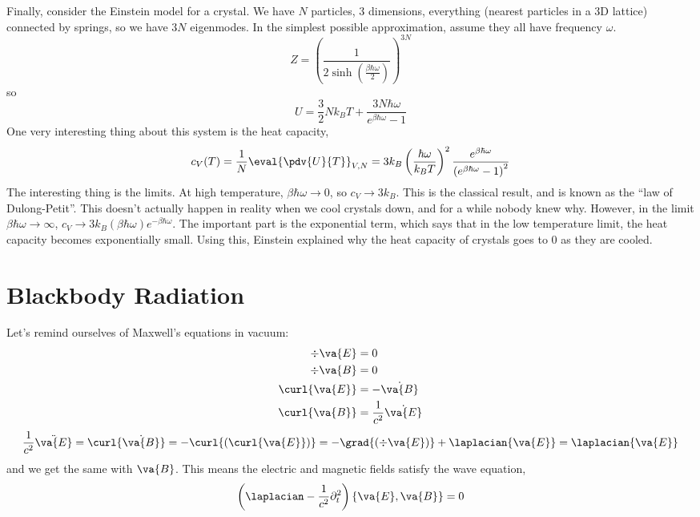 \documentclass[a4paper,twoside,master.tex]{subfiles}
\begin{document}
\begin{ex}
    Finally, consider the Einstein model for a crystal. We have $ N $ particles, $ 3 $ dimensions, everything (nearest particles in a 3D lattice)  connected by springs, so we have $ 3N $ eigenmodes. In the simplest possible approximation, assume they all have frequency $ \omega $.
    \begin{equation}
        Z = \left( \frac{1}{2\sinh(\frac{\beta \hbar \omega}{2})} \right)^{3N}
    \end{equation}
    so
    \begin{equation}
        U = \frac{3}{2} Nk_B T + \frac{3N \hbar \omega}{e^{\beta \hbar \omega} - 1}
    \end{equation}
    One very interesting thing about this system is the heat capacity,
    \begin{equation}
        c_V(T) = \frac{1}{N} \eval{\pdv{U}{T}}_{V,N} = 3k_B \left( \frac{\hbar \omega}{k_B T} \right)^2 \frac{e^{\beta \hbar \omega}}{\left( e^{\beta \hbar \omega} - 1 \right)^2}
    \end{equation}
    The interesting thing is the limits. At high temperature, $ \beta \hbar \omega \to 0 $, so $ c_V \to 3 k_B $. This is the classical result, and is known as the ``law of Dulong-Petit''. This doesn't actually happen in reality when we cool crystals down, and for a while nobody knew why. However, in the limit $ \beta \hbar \omega \to \infty $, $ c_V \to 3 k_B (\beta \hbar \omega) e^{- \beta \hbar \omega} $. The important part is the exponential term, which says that in the low temperature limit, the heat capacity becomes exponentially small. Using this, Einstein explained why the heat capacity of crystals goes to $ 0 $ as they are cooled.
    
\section{Blackbody Radiation}
\label{sec:blackbody_radiation}
Let's remind ourselves of Maxwell's equations in vacuum:
\begin{align}
    \div{\va{E}} &= 0 \\
    \div{\va{B}} &= 0 \\
    \curl{\va{E}} &= -\dot{\va{B}} \\
    \curl{\va{B}} &= \frac{1}{c^2} \dot{\va{E}}
\end{align}
\begin{equation}
    \frac{1}{c^2} \ddot{\va{E}} = \curl{\dot{\va{B}}} = - \curl{(\curl{\va{E}})} = - \grad{(\div{\va{E}})} + \laplacian{\va{E}} = \laplacian{\va{E}}
\end{equation}
and we get the same with $ \va{B} $. This means the electric and magnetic fields satisfy the wave equation,
\begin{equation}
    \left( \laplacian - \frac{1}{c^2} \partial_t^2 \right) \{\va{E}, \va{B}\} = 0
\end{equation}


\end{ex}
\end{document}
